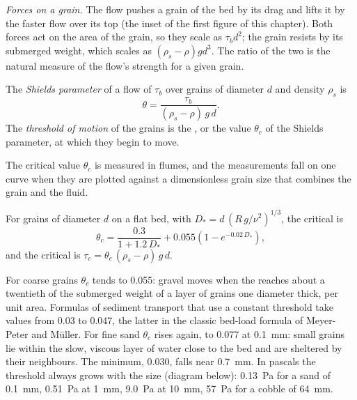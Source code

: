 \emph{Forces on a grain.} The flow pushes a grain of the bed by its drag and
lifts it by the faster flow over its top (the inset of the first figure of this
chapter). Both forces act on the area of the grain, so they scale as $\tau_b
d^2$; the grain resists by its submerged weight, which scales as
$(\rho_s - \rho) g d^3$. The ratio of the two is the natural measure of the
flow's strength for a given grain.

\begin{definition}\label{def:b1:erosion-transport:threshold}
The \emph{Shields parameter} of a flow of  $\tau_b$ over grains of diameter $d$ and density $\rho_s$ is
\[
  \theta = \frac{\tau_b}{(\rho_s - \rho)\,g\,d}.
\]
The \emph{threshold of motion} of the grains is the
, or the value $\theta_c$ of the Shields parameter, at which
they begin to move.
\end{definition}

The critical value $\theta_c$ is measured in flumes, and the measurements fall
on one curve when they are plotted against a dimensionless grain size that
combines the grain and the fluid.

\begin{proposition}\label{prop:b1:erosion-transport:soulsby}
For grains of diameter $d$ on a flat bed, with
$D_* = d\,\left(R\,g/\nu^2\right)^{1/3}$, the critical  is
\[
  \theta_c = \frac{0.3}{1 + 1.2\,D_*} + 0.055\left(1 - e^{-0.02\,D_*}\right),
\]
and the critical  is $\tau_c = \theta_c\,(\rho_s - \rho)\,g\,d$.
\end{proposition}
\admitted

For coarse grains $\theta_c$ tends to \num{0.055}: gravel moves when the  reaches about a twentieth of the submerged weight of a layer of
grains one diameter thick, per unit area. Formulas of sediment transport that
use a constant threshold take values from \num{0.03} to \num{0.047}, the
latter in the classic bed-load formula of Meyer-Peter and Müller. For fine sand $\theta_c$ rises again, to
\num{0.077} at \qty{0.1}{mm}: small grains lie within the slow, viscous layer
of water close to the bed and are sheltered by their neighbours. The minimum,
\num{0.030}, falls near \qty{0.7}{mm}. In pascals the threshold always grows
with the size (diagram below): \qty{0.13}{Pa} for a sand of \qty{0.1}{mm},
\qty{0.51}{Pa} at \qty{1}{mm}, \qty{9.0}{Pa} at \qty{10}{mm}, \qty{57}{Pa} for a
cobble of \qty{64}{mm}.

